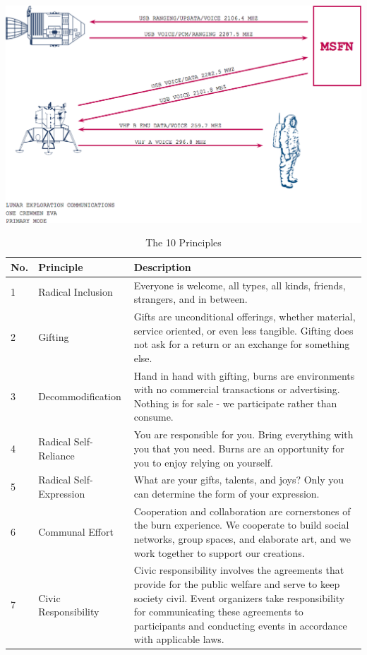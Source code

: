 \begin{center}
	\includegraphics[width=.7\textwidth]{images/communication2}
\end{center}

\vspace*{\fill}
\begin{table}[h!]
\footnotesize
\centering
\caption[The 10 Principles]{The 10 Principles}
\label{tbl:tenprincples}
\begin{tabular}{@{}llp{4.3in}@{}}
\toprule
\textbf{No.} & \textbf{Principle}               & \textbf{Description}                                 \\ \midrule
1   & Radical Inclusion       & Everyone is welcome, all types, all kinds, friends, strangers, and in between.         \\[1em]
2   & Gifting                 & Gifts are unconditional offerings, whether material, service oriented, or even less tangible. Gifting does not ask for a return or an exchange for something else.        \\[1em]
3   & Decommodification       & Hand in hand with gifting, burns are environments with no commercial transactions or advertising. Nothing is for sale - we participate rather than consume.        \\[1em]
4   & Radical Self-Reliance   & You are responsible for you. Bring everything with you that you need. Burns are an opportunity for you to enjoy relying on yourself.          \\[1em]
5   & Radical Self-Expression & What are your gifts, talents, and joys? Only you can determine the form of your expression.         \\[1em]
6   & Communal Effort         & Cooperation and collaboration are cornerstones of the burn experience. We cooperate to build social networks, group spaces, and elaborate art, and we work together to support our creations.         \\[1em]
7   & Civic Responsibility    & Civic responsibility involves the agreements that provide for the public welfare and serve to keep society civil. Event organizers take responsibility for communicating these agreements to participants and conducting events in accordance with applicable laws.         \\[1em]

\end{tabular}
\end{table}
